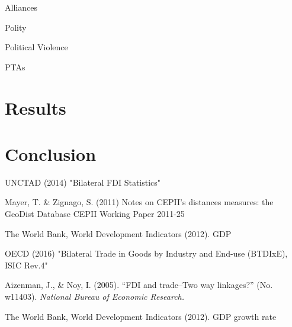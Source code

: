 \documentclass{article}
\begin{document}
Alliances

Polity

Political Violence

PTAs

\section{Results}

\section{Conclusion}


\newpage
\begin{thebibliography}{9}


 UNCTAD (2014) "Bilateral FDI Statistics"

 Mayer, T. \& Zignago, S. (2011) Notes on CEPII's distances measures: the GeoDist Database CEPII Working Paper 2011-25

 The World Bank, World Development Indicators (2012). GDP

 OECD (2016) "Bilateral Trade in Goods by Industry and End-use (BTDIxE), ISIC Rev.4"

 Aizenman, J., \& Noy, I. (2005). ``FDI and trade--Two way linkages?'' (No. w11403). \emph{National Bureau of Economic Research.}

 The World Bank, World Development Indicators (2012). GDP growth rate

\end{thebibliography}
\end{document}
